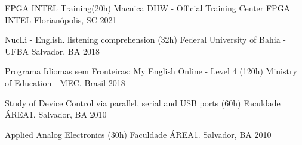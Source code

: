 

\begin{cvhonors}

\cvhonor
  {FPGA INTEL Training(20h)} %
  {Macnica DHW - Official Training Center FPGA INTEL} %
  {Florianópolis, SC} %
  {2021} %

\cvhonor
  {NucLi - English. listening comprehension (32h)} %
  {Federal University of Bahia - UFBA} %
  {Salvador, BA} %
  {2018} %
    
\cvhonor
  {Programa Idiomas sem Fronteiras: My English Online - Level 4 (120h) } %
  {Ministry of Education - MEC.} %
  {Brasil} %
  {2018} %

\cvhonor
  {Study of Device Control via parallel, serial and USB ports (60h)} %
  {Faculdade ÁREA1.} %
  {Salvador, BA} %
  {2010} %

\cvhonor
  {Applied Analog Electronics (30h)} %
  {Faculdade ÁREA1.} %
  {Salvador, BA} %
  {2010} %

\end{cvhonors}
